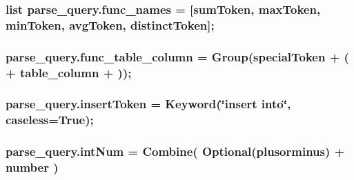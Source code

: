 \subsubsection[{\texorpdfstring{func\+\_\+names}{func_names}}]{\setlength{\rightskip}{0pt plus 5cm}list parse\+\_\+query.\+func\+\_\+names = \mbox{[}{\bf sum\+Token}, {\bf max\+Token}, {\bf min\+Token}, {\bf avg\+Token}, {\bf distinct\+Token}\mbox{]};}\hypertarget{namespaceparse__query_aa9f089f21476dbb671d1fde5cbe7a7bc}{}\label{namespaceparse__query_aa9f089f21476dbb671d1fde5cbe7a7bc}
\subsubsection[{\texorpdfstring{func\+\_\+table\+\_\+column}{func_table_column}}]{\setlength{\rightskip}{0pt plus 5cm}parse\+\_\+query.\+func\+\_\+table\+\_\+column = Group({\bf special\+Token} + \textquotesingle{}(\textquotesingle{} + {\bf table\+\_\+column} + \textquotesingle{})\textquotesingle{});}\hypertarget{namespaceparse__query_a0dcad7340b58d9bb7af20ce8536ee213}{}\label{namespaceparse__query_a0dcad7340b58d9bb7af20ce8536ee213}
\subsubsection[{\texorpdfstring{insert\+Token}{insertToken}}]{\setlength{\rightskip}{0pt plus 5cm}parse\+\_\+query.\+insert\+Token = Keyword(\char`\"{}insert into\char`\"{}, caseless=True);}\hypertarget{namespaceparse__query_a9e4017fe334976aee7c5d652e10def8f}{}\label{namespaceparse__query_a9e4017fe334976aee7c5d652e10def8f}
\subsubsection[{\texorpdfstring{int\+Num}{intNum}}]{\setlength{\rightskip}{0pt plus 5cm}parse\+\_\+query.\+int\+Num = Combine( Optional({\bf plusorminus}) + {\bf number} )}\hypertarget{namespaceparse__query_abe733870f0060062cc27e12df022f113}{}\label{namespaceparse__query_abe733870f0060062cc27e12df022f113}
